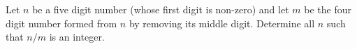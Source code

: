 Let $n$ be a five digit number (whose first digit is non-zero) and let $m$ be the four digit number formed from $n$ by removing its middle digit. Determine all $n$ such that $n/m$ is an integer.